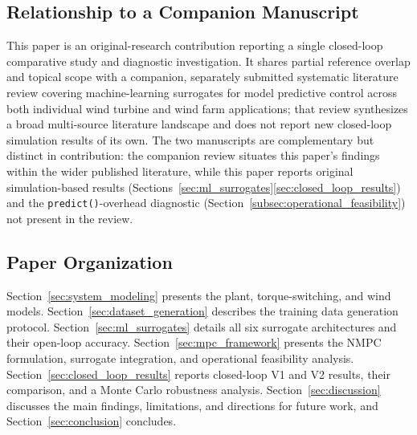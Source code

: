 
\subsection{Relationship to a Companion Manuscript}
\label{subsec:companion_manuscript}

This paper is an original-research contribution reporting a single
closed-loop comparative study and diagnostic investigation. It shares
partial reference overlap and topical scope with a companion, separately
submitted systematic literature review covering machine-learning
surrogates for model predictive control across both individual wind
turbine and wind farm applications; that review synthesizes a broad
multi-source literature landscape and does not report new closed-loop
simulation results of its own. The two manuscripts are complementary but
distinct in contribution: the companion review situates this paper's
findings within the wider published literature, while this paper
reports original simulation-based results (Sections~\ref{sec:ml_surrogates}\ref{sec:closed_loop_results})
and the \texttt{predict()}-overhead diagnostic
(Section~\ref{subsec:operational_feasibility}) not present in the review.

\subsection{Paper Organization}
\label{subsec:organization}

Section~\ref{sec:system_modeling} presents the plant, torque-switching,
and wind models. Section~\ref{sec:dataset_generation} describes the
training data generation protocol. Section~\ref{sec:ml_surrogates}
details all six surrogate architectures and their open-loop accuracy.
Section~\ref{sec:mpc_framework} presents the NMPC formulation, surrogate
integration, and operational feasibility analysis. Section~\ref{sec:closed_loop_results}
reports closed-loop V1 and V2 results, their comparison, and a Monte Carlo
robustness analysis. Section~\ref{sec:discussion} discusses the main
findings, limitations, and directions for future work, and
Section~\ref{sec:conclusion} concludes.
